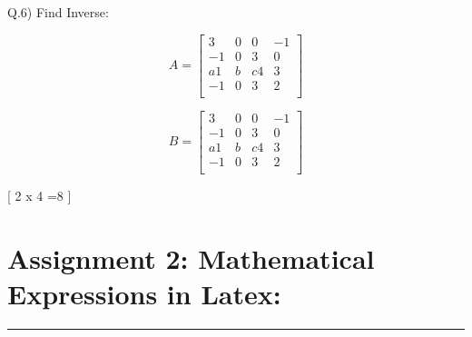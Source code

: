 \documentclass[a4paper,12pt,oneside,article]{memoir}
\begin{document}
\begin{flushleft}
Q.6)
	Find Inverse:
	
\begin{flushleft}

\begin{equation*}

A = \begin{bmatrix}

3 & 0 & 0  &  -1 \\

-1 & 0 & 3  & 0 \\

a1 & b & c4 & 3 \\

-1 & 0 & 3 & 2 \\

\end{bmatrix}

\end{equation*}

\begin{equation*}

B = \begin{bmatrix}

3 & 0 & 0  &  -1 \\

-1 & 0 & 3  & 0 \\

a1 & b & c4 & 3 \\

-1 & 0 & 3 & 2 \\

\end{bmatrix}

\end{equation*}

\end{flushleft} 

\begin{flushright}

[ 2 x 4 =8 ]

\end{flushright}



\newpage

\section{Assignment 2: Mathematical Expressions in Latex:}

\hrule

\vspace{2}


\end{flushleft}
\end{document}

